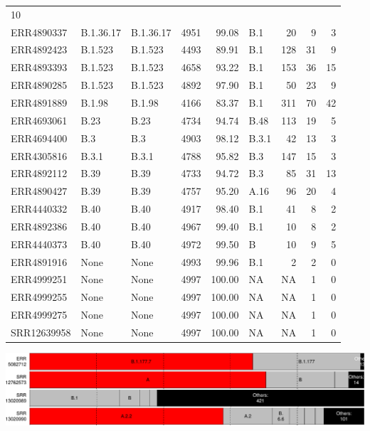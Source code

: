 \documentclass[
]{article}
\begin{document}
\begin{longtable}[]{@{}lllrrlrrr@{}}
10\tabularnewline
ERR4890337 & B.1.36.17 & B.1.36.17 & 4951 & 99.08 & B.1 & 20 & 9 &
3\tabularnewline
ERR4892423 & B.1.523 & B.1.523 & 4493 & 89.91 & B.1 & 128 & 31 &
9\tabularnewline
ERR4893393 & B.1.523 & B.1.523 & 4658 & 93.22 & B.1 & 153 & 36 &
15\tabularnewline
ERR4890285 & B.1.523 & B.1.523 & 4892 & 97.90 & B.1 & 50 & 23 &
9\tabularnewline
ERR4891889 & B.1.98 & B.1.98 & 4166 & 83.37 & B.1 & 311 & 70 &
42\tabularnewline
ERR4693061 & B.23 & B.23 & 4734 & 94.74 & B.48 & 113 & 19 &
5\tabularnewline
ERR4694400 & B.3 & B.3 & 4903 & 98.12 & B.3.1 & 42 & 13 &
3\tabularnewline
ERR4305816 & B.3.1 & B.3.1 & 4788 & 95.82 & B.3 & 147 & 15 &
3\tabularnewline
ERR4892112 & B.39 & B.39 & 4733 & 94.72 & B.3 & 85 & 31 &
13\tabularnewline
ERR4890427 & B.39 & B.39 & 4757 & 95.20 & A.16 & 96 & 20 &
4\tabularnewline
ERR4440332 & B.40 & B.40 & 4917 & 98.40 & B.1 & 41 & 8 &
2\tabularnewline
ERR4892386 & B.40 & B.40 & 4967 & 99.40 & B.1 & 10 & 8 &
2\tabularnewline
ERR4440373 & B.40 & B.40 & 4972 & 99.50 & B & 10 & 9 & 5\tabularnewline
ERR4891916 & None & None & 4993 & 99.96 & B.1 & 2 & 2 & 0\tabularnewline
ERR4999251 & None & None & 4997 & 100.00 & NA & NA & 1 &
0\tabularnewline
ERR4999255 & None & None & 4997 & 100.00 & NA & NA & 1 &
0\tabularnewline
ERR4999275 & None & None & 4997 & 100.00 & NA & NA & 1 &
0\tabularnewline
SRR12639958 & None & None & 4997 & 100.00 & NA & NA & 1 &
0\tabularnewline
\bottomrule
\end{longtable}

\includegraphics{pangolin_results_report_files/figure-latex/pareto-2.pdf}
\end{document}

